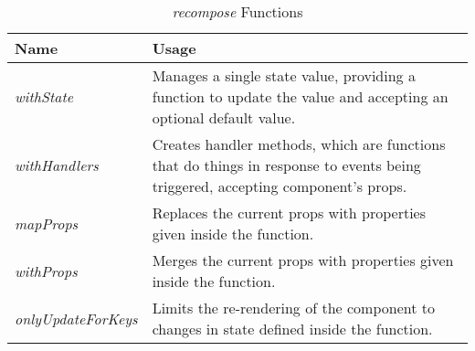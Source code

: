 \begin{table}[H]
    \centering
    \begin{tabularx}{\textwidth}{ |l|X| }
        \hline
        \rowcolor[HTML]{C0C0C0} 
        \textbf{Name}              & \textbf{Usage}                                                                                                                  \\ \hline
        \textit{withState}         & Manages a single state value, providing a function to update the value and accepting an optional default value.                 \\ \hline
        \textit{withHandlers}      & Creates handler methods, which are functions that do things in response to events being triggered, accepting component's props. \\ \hline
        \textit{mapProps}          & Replaces the current props with properties given inside the function.                                                           \\ \hline
        \textit{withProps}         & Merges the current props with properties given inside the function.                                                             \\ \hline
        \textit{onlyUpdateForKeys} & Limits the re-rendering of the component to changes in state defined inside the function.                                       \\ \hline
    \end{tabularx}
    \caption{\textit{recompose} Functions}
    \label{tab:recomposeFunctions}
\end{table}

